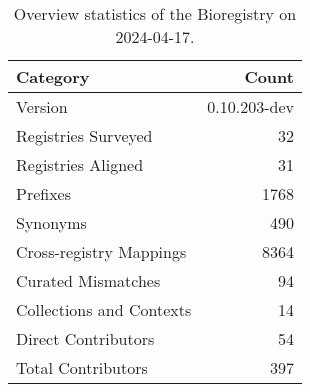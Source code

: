 \begin{table}
\caption{Overview statistics of the Bioregistry on 2024-04-17.}
\label{tab:bioregistry-summary}
\begin{tabular}{lr}
\toprule
Category & Count \\
\midrule
Version & 0.10.203-dev \\
Registries Surveyed & 32 \\
Registries Aligned & 31 \\
Prefixes & 1768 \\
Synonyms & 490 \\
Cross-registry Mappings & 8364 \\
Curated Mismatches & 94 \\
Collections and Contexts & 14 \\
Direct Contributors & 54 \\
Total Contributors & 397 \\
\bottomrule
\end{tabular}
\end{table}

